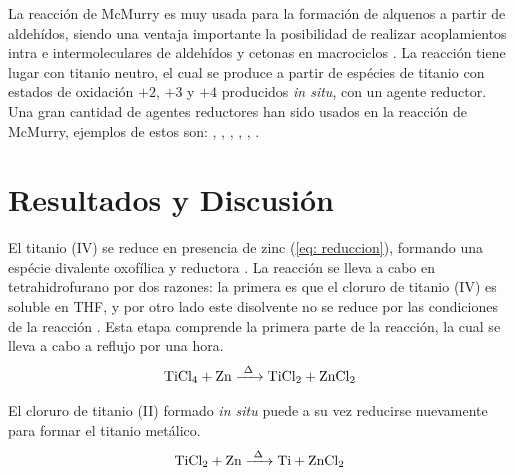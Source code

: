 \documentclass[fleqn,11pt]{SelfArx}
\begin{document}
La reacci\'on de McMurry es muy usada para la formaci\'on de alquenos a partir de aldeh\'idos, siendo una ventaja importante la posibilidad de realizar acoplamientos intra e intermoleculares de aldeh\'idos y cetonas en macrociclos \cite{Wang2010, Villiers1997}. La reacci\'on tiene lugar con titanio neutro, el cual se produce a partir de esp\'ecies de titanio con estados de oxidaci\'on $+2$, $+3$ y $+4$ producidos \textit{in situ}, con un agente reductor. Una gran cantidad de agentes reductores han sido usados en la reacci\'on de McMurry, ejemplos de estos son: , , , , ,  \cite{Wang2010}.

\newpage

\section{Resultados y Discusi\'on}
El titanio (IV) se reduce en presencia de zinc (\autoref{eq: reduccion}), formando una esp\'ecie divalente oxof\'ilica y reductora \cite{richards2001}. La reacci\'on se lleva a cabo en tetrahidrofurano por dos razones: la primera es que el cloruro de titanio (IV) es soluble en THF, y por otro lado este disolvente no se reduce por las condiciones de la reacci\'on \cite{richards2001}. Esta etapa comprende la primera parte de la reacci\'on, la cual se lleva a cabo a reflujo por una hora.
\begin{equation}\label{eq: reduccion}
	\ce{TiCl4 + Zn ->[\Delta] TiCl2 + ZnCl2}
\end{equation}

El cloruro de titanio (II) formado \textit{in situ} puede a su vez reducirse nuevamente para formar el titanio met\'alico.
\begin{equation}
	\ce{TiCl2 + Zn ->[\Delta] Ti + ZnCl2}
\end{equation}
\end{document}

